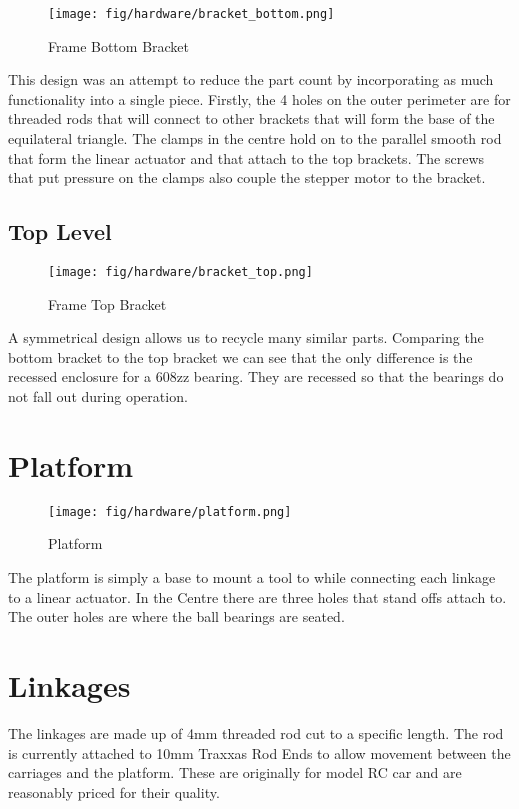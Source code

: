 \documentclass[a4paper, 11pt, twoside]{Thesis}  %
\begin{document}
\begin{figure}[H]
\centering%
\texttt{[image: fig/hardware/bracket\_bottom.png]}
\caption{Frame Bottom Bracket}
\label{fig:bracket_bottom.png}
\end{figure}
This design was an attempt to reduce the part count by incorporating as much functionality into a single piece. Firstly, the 4 holes on the outer perimeter are for threaded rods that will connect to other brackets that will form the base of the equilateral triangle. The clamps in the centre hold on to the parallel smooth rod that form the linear actuator and that attach to the top brackets. The screws that put pressure on the clamps also couple the stepper motor to the bracket.

\subsection{Top Level}
\begin{figure}[H]
\centering%
\texttt{[image: fig/hardware/bracket\_top.png]}
\caption{Frame Top Bracket}
\label{fig:bracket_top.png}
\end{figure}
A symmetrical design allows us to recycle many similar parts. Comparing the bottom bracket to the top bracket we can see that the only difference is the recessed enclosure for a 608zz bearing. They are recessed  so that the bearings do not fall out during operation.

\section{Platform}


\begin{figure}[H]
\centering%
\texttt{[image: fig/hardware/platform.png]}
\caption{Platform}
\label{fig:platform.png}
\end{figure}
The platform is simply a base to mount a tool to while connecting each linkage to a linear actuator. In the Centre there are three holes that stand offs attach to. The outer holes are where the ball bearings are seated.

\section{Linkages}

The linkages are made up of 4mm threaded rod cut to a specific length. The rod is currently attached to 10mm Traxxas Rod Ends to allow movement between the carriages and the platform. These are originally for model RC car and are reasonably priced for their quality.
\end{document}
